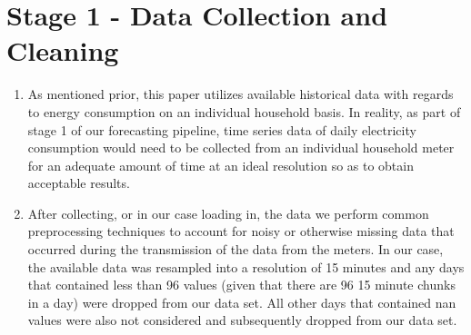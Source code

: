\section{Stage 1 - Data Collection and Cleaning}
\label{sec:Methodology:Stage-1}
\begin{adjustwidth}{-1.65cm}{0.0cm}%
    \begin{enumerate}[label=Step 1.\arabic*:, leftmargin=*]
    \setlength\itemsep{1em}
        \item As mentioned prior, this paper utilizes available historical data with regards to energy consumption on an individual household basis. In reality, as part of stage 1 of our forecasting pipeline, time series data of daily electricity consumption would need to be collected from an individual household meter for an adequate amount of time at an ideal resolution so as to obtain acceptable results.
        \item After collecting, or in our case loading in, the data we perform common preprocessing techniques to account for noisy or otherwise missing data that occurred during the transmission of the data from the meters. In our case, the available data was resampled into a resolution of 15 minutes and any days that contained less than 96 values (given that there are 96 15 minute chunks in a day) were dropped from our data set. All other days that contained \gls{nan} values were also not considered and subsequently dropped from our data set.
    \end{enumerate}
\end{adjustwidth}


